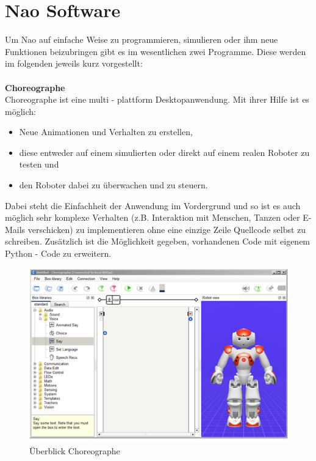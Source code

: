 \section{Nao Software}
Um Nao auf einfache Weise zu programmieren, simulieren oder ihm neue Funktionen beizubringen gibt es im wesentlichen zwei Programme. Diese werden im folgenden jeweils kurz vorgestellt:
\\
\\
\noindent
\textbf{Choreographe} 
\\
Choreographe ist eine multi - plattform Desktopanwendung. Mit ihrer Hilfe ist es möglich:
\begin{itemize}
\item Neue Animationen und Verhalten zu erstellen,
\item diese entweder auf einem simulierten  oder direkt auf einem realen Roboter zu testen und
\item den Roboter dabei zu überwachen und zu steuern.
\end{itemize}
Dabei steht die Einfachheit der Anwendung im Vordergrund und so ist es auch möglich sehr komplexe Verhalten (z.B. Interaktion mit Menschen, Tanzen oder E-Mails verschicken) zu implementieren ohne eine einzige Zeile Quellcode selbst zu schreiben. Zusätzlich ist die Möglichkeit gegeben, vorhandenen Code mit eigenem Python - Code zu erweitern.

\begin{figure}[H]						
	\centering							
	\includegraphics[scale=1.0]{Bilder/choreographe.png}			
	\caption{Überblick Choreographe}						
	\label{f:nao_choreographe}						
\end{figure}

